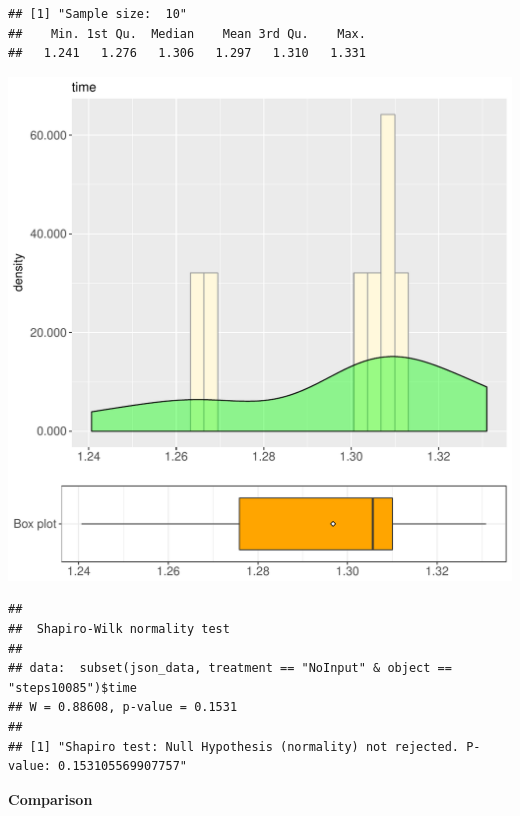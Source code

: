 \documentclass{article}\usepackage[]{graphicx}\usepackage[]{color}
\makeatletter
\def\maxwidth{ %
  \ifdim\Gin@nat@width>\linewidth
    \linewidth
  \else
    \Gin@nat@width
  \fi
}
\newenvironment{kframe}{%
 \def\at@end@of@kframe{}%
 \ifinner\ifhmode%
  \def\at@end@of@kframe{\end{minipage}}%
  \begin{minipage}{\columnwidth}%
 \fi\fi%
 \def\FrameCommand##1{\hskip\@totalleftmargin \hskip-\fboxsep
 \colorbox{shadecolor}{##1}\hskip-\fboxsep
     \hskip-\linewidth \hskip-\@totalleftmargin \hskip\columnwidth}%
 \MakeFramed {\advance\hsize-\width
   \@totalleftmargin\z@ \linewidth\hsize
   \@setminipage}}%
 {\par\unskip\endMakeFramed%
 \at@end@of@kframe}
\newenvironment{knitrout}{}{} %
\makeatother
\begin{document}
\begin{knitrout}
\color{fgcolor}\begin{kframe}
\begin{verbatim}
## [1] "Sample size:  10"
##    Min. 1st Qu.  Median    Mean 3rd Qu.    Max. 
##   1.241   1.276   1.306   1.297   1.310   1.331
\end{verbatim}
\end{kframe}
\includegraphics[width=\maxwidth]{figure/RH4_NoInput_steps10085-1} 
\begin{kframe}\begin{verbatim}
## 
## 	Shapiro-Wilk normality test
## 
## data:  subset(json_data, treatment == "NoInput" & object == "steps10085")$time
## W = 0.88608, p-value = 0.1531
## 
## [1] "Shapiro test: Null Hypothesis (normality) not rejected. P-value: 0.153105569907757"
\end{verbatim}
\end{kframe}
\end{knitrout}
  
 \textbf{Comparison}
  
\end{document}
